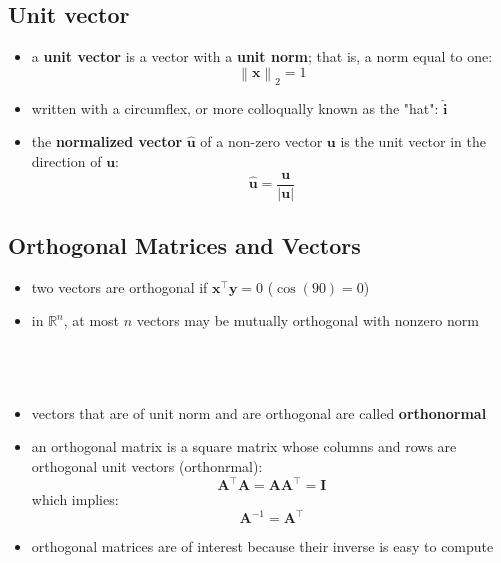 \documentclass[11pt,twocolumn]{report}
\def\realnumbers{\mathbb{R}}
\newcommand{\norm}[1]{\left\lVert#1\right\rVert}
\begin{document}
\subsection{Unit vector}
\begin{itemize}
  \item a \textbf{unit vector} is a vector with a \textbf{unit norm}; that is,
    a norm equal to one:
    \begin{equation}
      \norm{\bm{x}}_2 = 1
    \end{equation}
  \item written with a circumflex, or more colloqually known as the "hat":
    $\hat{\bm{i}}$
  \item the \textbf{normalized vector} $\hat{\bm{u}}$ of a non-zero vector
    $\bm{u}$ is the unit vector in the direction of $\bm{u}$:
    \begin{equation}
      \hat{\bm{u}} = \frac{\bm{u}}{|\bm{u}|}
    \end{equation}
\end{itemize}

\subsection{Orthogonal Matrices and Vectors}
\begin{itemize}
  \item two vectors are orthogonal if $\bm{x}^\intercal\bm{y} = 0$ ($\cos(90) =
    0$)
  \item in $\realnumbers^n$, at most $n$ vectors may be mutually orthogonal
    with nonzero norm
    \\
    \\
    \\
    \\
  \item vectors that are of unit norm and are orthogonal are called
    \textbf{orthonormal}
  \item an orthogonal matrix is a square matrix whose columns and rows are
    orthogonal unit vectors (orthonrmal):
    \begin{equation}
      \bm{A}^\intercal\bm{A} = \bm{A}\bm{A}^\intercal = \bm{I}
    \end{equation}
    which implies:
    \begin{equation}
      \bm{A}^{-1} = \bm{A}^\intercal
    \end{equation}
  \item orthogonal matrices are of interest because their inverse is easy to
    compute
\end{itemize}
\end{document}
